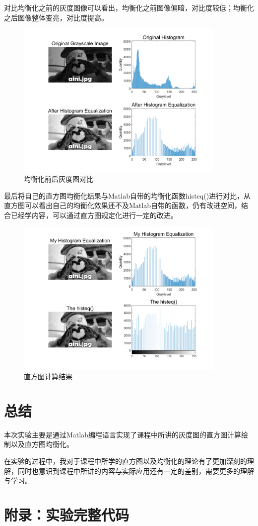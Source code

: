 \documentclass{../source/Experiment}
\begin{document}
        对比均衡化之前的灰度图像可以看出，均衡化之前图像偏暗，对比度较低；均衡化之后图像整体变亮，对比度提高。

        \begin{figure}[H]
            \centering
            \includegraphics[width = 0.9\textwidth]{第一次/hw1-3.png}
            \caption{均衡化前后灰度图对比}
        \end{figure}

        最后将自己的直方图均衡化结果与Matlab自带的均衡化函数histeq()进行对比，从直方图可以看出自己的均衡化效果还不及Matlab自带的函数，仍有改进空间，结合已经学内容，可以通过直方图规定化进行一定的改进。
        \begin{figure}[H]
            \centering
            \includegraphics[width = 0.9\textwidth]{第一次/hw1-4.png}
            \caption{直方图计算结果}
        \end{figure}

    \section{总结}
    本次实验主要是通过Matlab编程语言实现了课程中所讲的灰度图的直方图计算绘制以及直方图均衡化。
    
    在实验的过程中，我对于课程中所学的直方图以及均衡化的理论有了更加深刻的理解，同时也意识到课程中所讲的内容与实际应用还有一定的差别，需要更多的理解与学习。

    \section{附录：实验完整代码}
    
\end{document}
